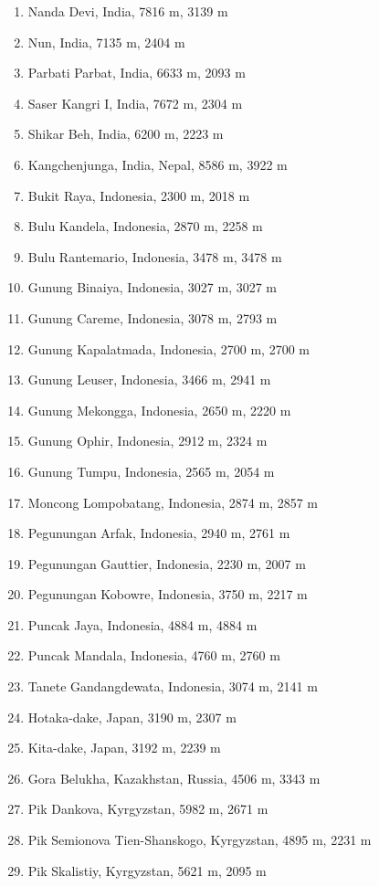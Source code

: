 \documentclass[10pt,twocolumn,letterpaper]{article}
\begin{document}
\begin{flushleft}
\begin{enumerate}
    \item Nanda Devi, India, 7816 m, 3139 m
    \item Nun, India, 7135 m, 2404 m
    \item Parbati Parbat, India, 6633 m, 2093 m
    \item Saser Kangri I, India, 7672 m, 2304 m
    \item Shikar Beh, India, 6200 m, 2223 m
    \item Kangchenjunga, India, Nepal, 8586 m, 3922 m
    \item Bukit Raya, Indonesia, 2300 m, 2018 m
    \item Bulu Kandela, Indonesia, 2870 m, 2258 m
    \item Bulu Rantemario, Indonesia, 3478 m, 3478 m
    \item Gunung Binaiya, Indonesia, 3027 m, 3027 m
    \item Gunung Careme, Indonesia, 3078 m, 2793 m
    \item Gunung Kapalatmada, Indonesia, 2700 m, 2700 m
    \item Gunung Leuser, Indonesia, 3466 m, 2941 m
    \item Gunung Mekongga, Indonesia, 2650 m, 2220 m
    \item Gunung Ophir, Indonesia, 2912 m, 2324 m
    \item Gunung Tumpu, Indonesia, 2565 m, 2054 m
    \item Moncong Lompobatang, Indonesia, 2874 m, 2857 m
    \item Pegunungan Arfak, Indonesia, 2940 m, 2761 m
    \item Pegunungan Gauttier, Indonesia, 2230 m, 2007 m
    \item Pegunungan Kobowre, Indonesia, 3750 m, 2217 m
    \item Puncak Jaya, Indonesia, 4884 m, 4884 m
    \item Puncak Mandala, Indonesia, 4760 m, 2760 m
    \item Tanete Gandangdewata, Indonesia, 3074 m, 2141 m
    \item Hotaka-dake, Japan, 3190 m, 2307 m
    \item Kita-dake, Japan, 3192 m, 2239 m
    \item Gora Belukha, Kazakhstan, Russia, 4506 m, 3343 m
    \item Pik Dankova, Kyrgyzstan, 5982 m, 2671 m
    \item Pik Semionova Tien-Shanskogo, Kyrgyzstan, 4895 m, 2231 m
    \item Pik Skalistiy, Kyrgyzstan, 5621 m, 2095 m

\end{enumerate}
\end{flushleft}
\end{document}
